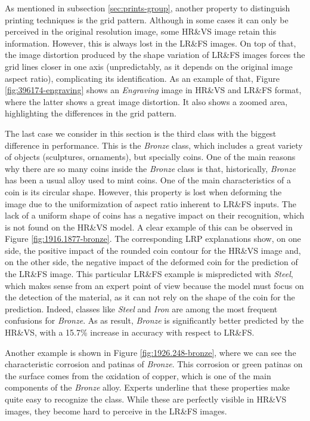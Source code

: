 \documentclass{article}
\begin{document}
As mentioned in subsection \ref{sec:prints-group}, another property to distinguish printing techniques is the grid pattern. Although in some cases it can only be perceived in the original resolution image, some HR\&VS image retain this information. However, this is always lost in the LR\&FS images. On top of that, the image distortion produced by the shape variation of LR\&FS images forces the grid lines closer in one axis (unpredictably, as it depends on the original image aspect ratio), complicating its identification. As an example of that, Figure \ref{fig:396174-engraving} shows an \textit{Engraving} image in HR\&VS and LR\&FS format, where the latter shows a great image distortion. It also shows a zoomed area, highlighting the differences in the grid pattern.

The last case we consider in this section is the third class with the biggest difference in performance. This is the \textit{Bronze} class, which includes a great variety of objects (\eg sculptures, ornaments), but specially coins. One of the main reasons why there are so many coins inside the \textit{Bronze} class is that, historically, \textit{Bronze} has been a usual alloy used to mint coins. One of the main characteristics of a coin is its circular shape. However, this property is lost when deforming the image due to the uniformization of aspect ratio inherent to LR\&FS inputs. The lack of a uniform shape of coins has a negative impact on their recognition, which is not found on the HR\&VS model. A clear example of this can be observed in Figure \ref{fig:1916.1877-bronze}. The corresponding LRP explanations show, on one side, the positive impact of the rounded coin contour for the HR\&VS image and, on the other side, the negative impact of the deformed coin for the prediction of the LR\&FS image. This particular LR\&FS example is mispredicted with \textit{Steel}, which makes sense from an expert point of view because the model must focus on the detection of the material, as it can not rely on the shape of the coin for the prediction. Indeed, classes like \textit{Steel} and \textit{Iron} are among the most frequent confusions for \textit{Bronze}. As as result, \textit{Bronze} is significantly better predicted by the HR\&VS, with a 15.7\% increase in accuracy with respect to LR\&FS.

Another example is shown in Figure \ref{fig:1926.248-bronze}, where we can see the characteristic corrosion and patinas of \textit{Bronze}. This corrosion or green patinas on the surface comes from the oxidation of copper, which is one of the main components of the \textit{Bronze} alloy. Experts underline that these properties make quite easy to recognize the class. While these are perfectly visible in HR\&VS images, they become hard to perceive in the LR\&FS images.
\end{document}
